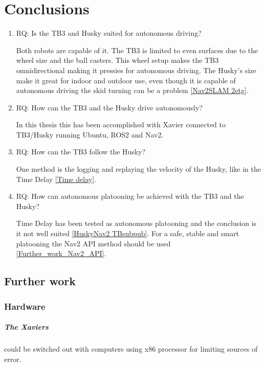 \chapter{Conclusions}

\begin{enumerate}
    \item RQ: Is the TB3 and Husky suited for autonomous driving? 
    
    Both robots are capable of it. The TB3 is limited to even surfaces due to the wheel size and the ball casters. This wheel setup makes the TB3 omnidirectional making it pressies for autonomous driving. 
    The Husky's size make it great for indoor and outdoor use, even though it is capable of autonomous driving the skid turning can be a problem \ref{Nav2SLAM 2etg}.

    \item RQ: How can the TB3 and the Husky drive autonomously?

    In this thesis this has been accomplished with Xavier connected to TB3/Husky running Ubuntu, ROS2 and Nav2.
    
    \item RQ: How can the TB3 follow the Husky? 

    One method is the logging and replaying the velocity of the Husky, like in the Time Delay \ref{Time delay}. 
    
    \item RQ: How can autonomous platooning be achieved with the TB3 and the Husky? 
    
    Time Delay has been tested as autonomous platooning and the conclusion is it not well suited \ref{HuskyNav2 TBsubpub}. For a safe, stable and smart platooning the Nav2 API method should be used \ref{Further_work_Nav2_API}.
\end{enumerate}



\section{Further work} \label{Further work}

\subsection{Hardware}
\paragraph{The Xaviers} could be switched out with computers using x86 processor for limiting sources of error. 

